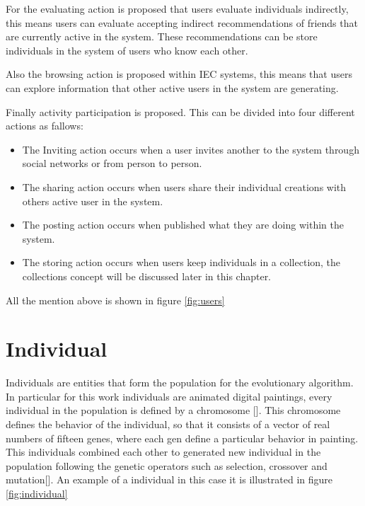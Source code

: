 For the evaluating action is proposed  that users evaluate individuals
indirectly, this means users can evaluate accepting indirect recommendations of
friends that are currently active in the system. These recommendations can be
store individuals in the system of users who know each other.

Also the  browsing action is proposed within IEC systems,  this means that users
can explore information that other active users in the system are generating.

Finally activity participation is proposed. This can be divided into four
different actions as fallows:

\begin{itemize}
\item The Inviting action occurs when a user invites another to the system through social networks or from person to person.
\item The sharing action occurs when users share their individual creations with others active user in the system.
\item The posting action occurs when published what they are doing within the system.
\item The storing action occurs when users keep individuals in a collection, the collections concept will be discussed later in this chapter.
\end{itemize}

All the mention above is shown in figure \ref{fig:users}

\section{Individual}

Individuals are entities that form the population for the evolutionary
algorithm. In particular for  this work individuals are animated digital
paintings, every individual in the population is defined by a chromosome [].
This chromosome defines the behavior of the individual, so that it consists of a
vector of real numbers of fifteen genes, where each gen define a particular
behavior in painting. This individuals combined each other to generated new
individual in the population following the genetic operators such as selection,
crossover and mutation[]. An example of a individual in this case it is
illustrated in figure \ref{fig:individual}



